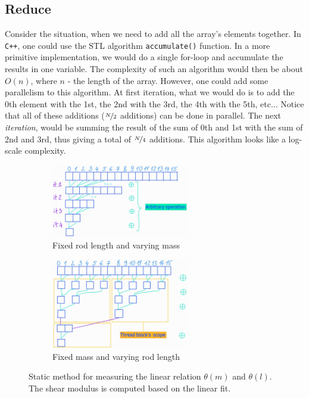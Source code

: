 \documentclass[12pt]{article}
\begin{document}
\subsection{Reduce}
Consider the situation, when we need to add all the array's elements together. In \verb|C++|, one could use 
the STL algorithm \verb|accumulate()| function. In a more primitive implementation, we would do a single for-loop 
and accumulate the results in one variable. The complexity of such an algorithm would then be about $O(n)$, where 
$n$ - the length of the array. However, one could add some parallelism to this algorithm. At first iteration, what we would 
do is to add the 0th element with the 1st, the 2nd with the 3rd, the 4th with the 5th, etc... Notice that 
all of these additions ($\nicefrac{N}{2}$ additions) can be done in parallel. The next \textit{iteration}, would be 
summing the result of the sum of 0th and 1st with the sum of 2nd and 3rd, thus giving a total of 
$\nicefrac{N}{4}$ additions. This algorithm looks like a log-scale complexity. 



\begin{figure}
   \centering
   \begin{subfigure}[t]{0.45\textwidth}
        \centering
        \includegraphics[width=6cm]{reduce_global.jpg}
        \caption{Fixed rod length and varying mass}
        \label{fig:static}
    \end{subfigure}
    \begin{subfigure}[t]{0.45\textwidth}
        \centering
        \includegraphics[width=6cm]{reduce_shared.jpg}
        \caption{Fixed mass and varying rod length}
        \label{fig:dynamic}
    \end{subfigure}
\label{fig:reduce}
\caption{Static method for measuring the linear relation $\theta(m)$ and $\theta(l)$. The shear modulus is computed based on the linear fit.}
\end{figure}
\end{document}
